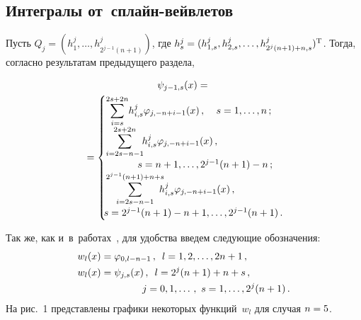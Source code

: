 \begin{multicols}{2}

\section{Интегралы от~сплайн-вейвлетов}

Пусть ${Q}_j=({h}_1^j,\dots,{h}_{2^{j-1}(n+1)}^j)$, 
где ${h}_s^j\hm=(h_{1,s}^j,h_{2,s}^j,\dots,h_{2^j (n+1)+n,s}^j)^{\mathrm{T}}$. 
Тогда,   согласно результатам предыдущего раздела,

\noindent
\begin{multline}
\label{U31}
\psi_{j-1,s}(x)={}\\
{}=
\begin{cases}
\displaystyle\sum\limits_{i=s}^{2s+2n} \! h_{i,s}^j\varphi_{j,-n+i-1}(x)\,,&\hspace*{-10mm}
s=1,\dots,n\,;\\
\displaystyle\sum\limits_{i=2s-n-1}^{2s+2n}\!\!
h_{i,s}^j\varphi_{j,-n+i-1}(x)\,,&\\ 
&\hspace*{-38mm}s=n+1,\dots,2^{j-1}(n+1)-n\,;
\\
\displaystyle\sum\limits_{i=2s-n-1}^{2^{j-1}(n+1)+n+s}\!\!\!\!
h_{i,s}^j
\varphi_{j,-n+i-1}(x)\,,&\\
&\hspace*{-50mm}s=2^{j-1}(n+1)-n+1,\dots,2^{j-1}(n+1)\,.
\end{cases}
\end{multline}


Так же, как и~в~работах~\cite{Lepik1, Lepik2, Lepik3, Lepik4, Lepik}, для удобства  
введем следующие обозначения:
\begin{align*}
&w_l(x)=\varphi_{0,l-n-1}\,,\enskip l=1,2,\dots,2n+1\,,\\
&w_l(x)=\psi_{j,s}(x)\,,\enskip l=2^j(n+1)+n+s\,, \\
&\hspace*{23mm} j=0,1,\dots\,, \ s=1,\dots,2^{j}(n+1)\,.
\end{align*}
На рис.~1 представлены графики некоторых функций~$w_l$ для случая $n\hm=5$.





\end{multicols}
